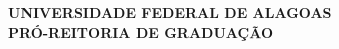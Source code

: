 \documentclass[12pt,a4paper]{article}
\begin{document}
	
	\begin{titlepage}
		\centering
		\large
		\textbf{UNIVERSIDADE FEDERAL DE ALAGOAS} \\
		\textbf{PRÓ-REITORIA DE GRADUAÇÃO} \\
		\vfill
	\end{titlepage}
	
	
\end{document}
